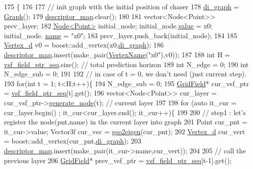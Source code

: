 \begin{DoxyCode}
175                                                               \{
176     
177     \textcolor{comment}{// init graph with the initial position of chaser }
178     \hyperlink{class_preplanner_af588e8495d5e78dd5a746f7c640daa4d}{di\_graph} = \hyperlink{_common_8h_a45f376d452c699e18013842e64602733}{Graph}();
179     \hyperlink{class_preplanner_a45603cfb24429584c4fc8bc42474e1ff}{descriptor\_map}.clear();
180     
181     vector<Node<Point>> prev\_layer;
182     \hyperlink{struct_node}{Node<Point>} initial\_node; initial\_node.\hyperlink{struct_node_a01b9071c0de774c720b64583262d1559}{value} = x0; initial\_node.
      \hyperlink{struct_node_a795bdc93cbf63ccddcdf2168d858492c}{name} = \textcolor{stringliteral}{"x0"};
183     prev\_layer.push\_back(initial\_node);
184     
185     \hyperlink{_common_8h_a1f671d518f573b692b5efa57ed576f36}{Vertex\_d} v0 = boost::add\_vertex(x0,\hyperlink{class_preplanner_af588e8495d5e78dd5a746f7c640daa4d}{di\_graph});
186     \hyperlink{class_preplanner_a45603cfb24429584c4fc8bc42474e1ff}{descriptor\_map}.insert(make\_pair(\hyperlink{_common_8h_a817e52d0171d1503034d4cbe7fd89a1b}{VertexName}(\textcolor{stringliteral}{"x0"}),v0));
187  
188     \textcolor{keywordtype}{int} H = \hyperlink{class_preplanner_aab0f91e34b86eaa581c7642ba5059308}{vsf\_field\_ptr\_seq}.size(); \textcolor{comment}{// total prediction horizon }
189     \textcolor{keywordtype}{int} N\_edge = 0; 
190     \textcolor{keywordtype}{int} N\_edge\_sub = 0;
191 
192     \textcolor{comment}{// in case of t = 0, we don't need (just current step). }
193     \textcolor{keywordflow}{for}(\textcolor{keywordtype}{int} t = 1; t<H;t++)\{
194         N\_edge\_sub = 0;
195         \hyperlink{struct_grid_field}{GridField}* cur\_vsf\_ptr = \hyperlink{class_preplanner_aab0f91e34b86eaa581c7642ba5059308}{vsf\_field\_ptr\_seq}[t].get();        
196         vector<Node<Point>> cur\_layer = cur\_vsf\_ptr->\hyperlink{struct_grid_field_acd8fd9f0893ad94aa4f20b4b4d81802a}{generate\_node}(t); \textcolor{comment}{// current layer   }
197 
198         \textcolor{keywordflow}{for} (\textcolor{keyword}{auto} it\_cur = cur\_layer.begin() ; it\_cur<cur\_layer.end(); it\_cur++)\{
199             
200             \textcolor{comment}{// step1 :  let's register the node(pnt,name) in the current layer into graph }
201             Point cur\_pnt = it\_cur->value; Vector3f cur\_vec = \hyperlink{_common_8h_a3e35de4eb7396984c2c5018768885d91}{geo2eigen}(cur\_pnt); 
202             \hyperlink{_common_8h_a1f671d518f573b692b5efa57ed576f36}{Vertex\_d} cur\_vert = boost::add\_vertex(cur\_pnt,\hyperlink{class_preplanner_af588e8495d5e78dd5a746f7c640daa4d}{di\_graph});
203             \hyperlink{class_preplanner_a45603cfb24429584c4fc8bc42474e1ff}{descriptor\_map}.insert(make\_pair(it\_cur->name,cur\_vert));
204             
205             \textcolor{comment}{// call the previous layer  }
206             \hyperlink{struct_grid_field}{GridField}* prev\_vsf\_ptr = \hyperlink{class_preplanner_aab0f91e34b86eaa581c7642ba5059308}{vsf\_field\_ptr\_seq}[t-1].get();              
                

\end{DoxyCode}
